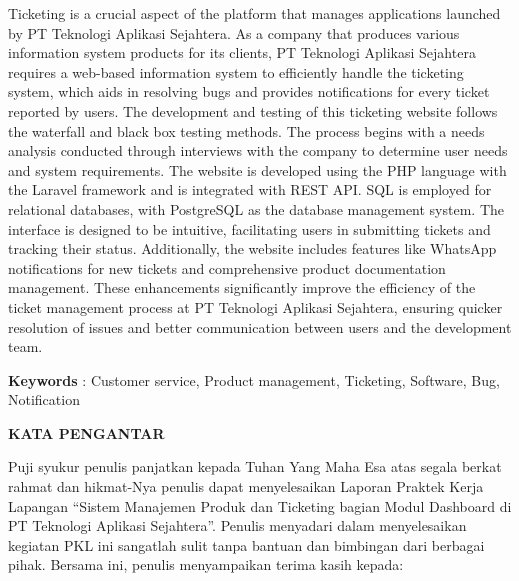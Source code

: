 \documentclass[12pt]{article}
\begin{document}
\noindent Ticketing is a crucial aspect of the platform that manages applications launched by PT Teknologi Aplikasi Sejahtera. As a company that produces various information system products for its clients, PT Teknologi Aplikasi Sejahtera requires a web-based information system to efficiently handle the ticketing system, which aids in resolving bugs and provides notifications for every ticket reported by users. The development and testing of this ticketing website follows the waterfall and black box testing methods. The process begins with a needs analysis conducted through interviews with the company to determine user needs and system requirements. The website is developed using the PHP language with the Laravel framework and is integrated with REST API. SQL is employed for relational databases, with PostgreSQL as the database management system. The interface is designed to be intuitive, facilitating users in submitting tickets and tracking their status. Additionally, the website includes features like WhatsApp notifications for new tickets and comprehensive product documentation management. These enhancements significantly improve the efficiency of the ticket management process at PT Teknologi Aplikasi Sejahtera, ensuring quicker resolution of issues and better communication between users and the development team.

\vspace*{1cm}
\noindent \textbf{Keywords} : Customer service, Product management, Ticketing, Software, Bug, Notification


\newpage

\begin{center}
    \textbf{\large KATA PENGANTAR} \\
\end{center}

Puji syukur penulis panjatkan kepada Tuhan Yang Maha Esa atas segala berkat rahmat dan hikmat-Nya penulis dapat menyelesaikan Laporan Praktek Kerja Lapangan “Sistem Manajemen Produk dan Ticketing bagian Modul Dashboard di PT Teknologi Aplikasi Sejahtera”. Penulis menyadari dalam menyelesaikan kegiatan PKL ini sangatlah sulit tanpa bantuan dan bimbingan dari berbagai  pihak. Bersama ini, penulis menyampaikan terima kasih kepada:
\end{document}
